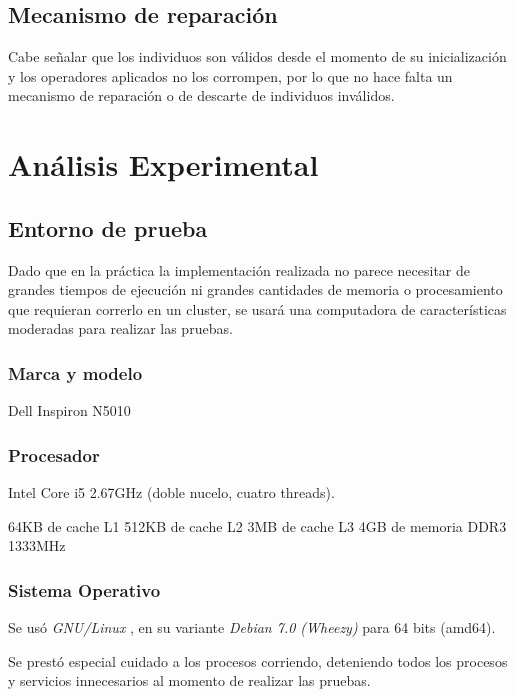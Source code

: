 \documentclass[journal]{IEEEtran}
\begin{document}
\subsection{Mecanismo de reparación}

Cabe señalar que los individuos son válidos desde el momento de su inicialización y los operadores aplicados no los corrompen, por lo que no hace falta un mecanismo de reparación o de descarte de individuos inválidos.

\section{Análisis Experimental}

\subsection{Entorno de prueba}

Dado que en la práctica la implementación realizada no parece necesitar de grandes tiempos de ejecución ni grandes cantidades de memoria o procesamiento que requieran correrlo en un cluster, se usará una computadora de características moderadas para realizar las pruebas.\\

\subsubsection{Marca y modelo}

Dell Inspiron N5010

\subsubsection{Procesador}

Intel Core i5 2.67GHz (doble nucelo, cuatro threads).

64KB de cache L1
512KB de cache L2
3MB de cache L3
4GB de memoria DDR3 1333MHz

\subsubsection{Sistema Operativo}

Se usó \emph{GNU/Linux} \cite{linux}, en su variante \emph{Debian 7.0 (Wheezy)} \cite{debian:wheezy} para 64 bits (amd64).

Se prestó especial cuidado a los procesos corriendo, deteniendo todos los procesos y servicios innecesarios al momento de realizar las pruebas.
\end{document}
